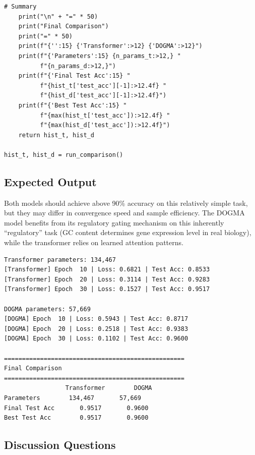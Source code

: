 \begin{lstlisting}[style=dogmapython, caption={Lab 7: Training loop and comparison.}]
    # Summary
    print("\n" + "=" * 50)
    print("Final Comparison")
    print("=" * 50)
    print(f"{'':15} {'Transformer':>12} {'DOGMA':>12}")
    print(f"{'Parameters':15} {n_params_t:>12,} "
          f"{n_params_d:>12,}")
    print(f"{'Final Test Acc':15} "
          f"{hist_t['test_acc'][-1]:>12.4f} "
          f"{hist_d['test_acc'][-1]:>12.4f}")
    print(f"{'Best Test Acc':15} "
          f"{max(hist_t['test_acc']):>12.4f} "
          f"{max(hist_d['test_acc']):>12.4f}")
    return hist_t, hist_d

hist_t, hist_d = run_comparison()
\end{lstlisting}

\subsection{Expected Output}

Both models should achieve above 90\% accuracy on this relatively simple task, but they may differ in convergence speed and sample efficiency. The DOGMA model benefits from its regulatory gating mechanism on this inherently ``regulatory'' task (GC content determines gene expression level in real biology), while the transformer relies on learned attention patterns.

\begin{lstlisting}[style=dogmapython, caption={Lab 7: Expected comparison output.}, numbers=none]
Transformer parameters: 134,467
[Transformer] Epoch  10 | Loss: 0.6821 | Test Acc: 0.8533
[Transformer] Epoch  20 | Loss: 0.3114 | Test Acc: 0.9283
[Transformer] Epoch  30 | Loss: 0.1527 | Test Acc: 0.9517

DOGMA parameters: 57,669
[DOGMA] Epoch  10 | Loss: 0.5943 | Test Acc: 0.8717
[DOGMA] Epoch  20 | Loss: 0.2518 | Test Acc: 0.9383
[DOGMA] Epoch  30 | Loss: 0.1102 | Test Acc: 0.9600

==================================================
Final Comparison
==================================================
                 Transformer        DOGMA
Parameters        134,467       57,669
Final Test Acc       0.9517       0.9600
Best Test Acc        0.9517       0.9600
\end{lstlisting}

\subsection{Discussion Questions}

